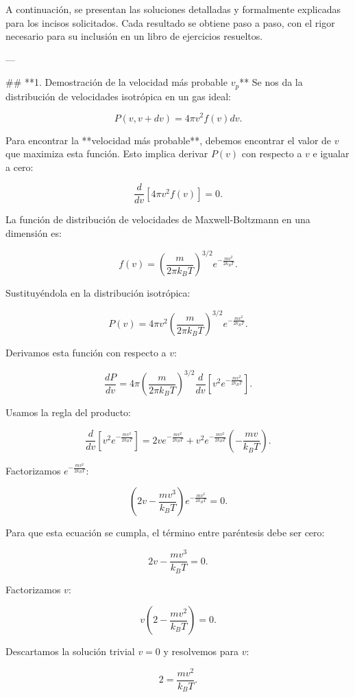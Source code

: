 A continuación, se presentan las soluciones detalladas y formalmente explicadas para los incisos solicitados. Cada resultado se obtiene paso a paso, con el rigor necesario para su inclusión en un libro de ejercicios resueltos.  

---

## **1. Demostración de la velocidad más probable \( v_p \)**
Se nos da la distribución de velocidades isotrópica en un gas ideal:

\[
P(v, v + dv) = 4\pi v^2 f(v) dv.
\]

Para encontrar la **velocidad más probable**, debemos encontrar el valor de \( v \) que maximiza esta función. Esto implica derivar \( P(v) \) con respecto a \( v \) e igualar a cero:

\[
\frac{d}{dv} [ 4\pi v^2 f(v) ] = 0.
\]

La función de distribución de velocidades de Maxwell-Boltzmann en una dimensión es:

\[
f(v) = \left( \frac{m}{2\pi k_B T} \right)^{3/2} e^{- \frac{m v^2}{2 k_B T}}.
\]

Sustituyéndola en la distribución isotrópica:

\[
P(v) = 4\pi v^2 \left( \frac{m}{2\pi k_B T} \right)^{3/2} e^{- \frac{m v^2}{2 k_B T}}.
\]

Derivamos esta función con respecto a \( v \):

\[
\frac{dP}{dv} = 4\pi \left( \frac{m}{2\pi k_B T} \right)^{3/2} \frac{d}{dv} \left[ v^2 e^{- \frac{m v^2}{2 k_B T}} \right].
\]

Usamos la regla del producto:

\[
\frac{d}{dv} \left[ v^2 e^{- \frac{m v^2}{2 k_B T}} \right] = 2v e^{- \frac{m v^2}{2 k_B T}} + v^2 e^{- \frac{m v^2}{2 k_B T}} \left(- \frac{m v}{k_B T} \right).
\]

Factorizamos \( e^{- \frac{m v^2}{2 k_B T}} \):

\[
\left( 2v - \frac{m v^3}{k_B T} \right) e^{- \frac{m v^2}{2 k_B T}} = 0.
\]

Para que esta ecuación se cumpla, el término entre paréntesis debe ser cero:

\[
2v - \frac{m v^3}{k_B T} = 0.
\]

Factorizamos \( v \):

\[
v \left( 2 - \frac{m v^2}{k_B T} \right) = 0.
\]

Descartamos la solución trivial \( v = 0 \) y resolvemos para \( v \):

\[
2 = \frac{m v^2}{k_B T}.
\]


